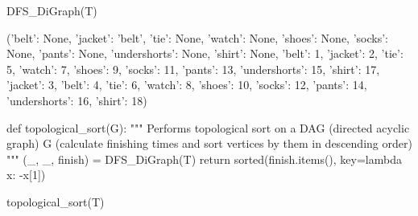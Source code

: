 \begin{sageCell}
    DFS_DiGraph(T)
\end{sageCell}
\begin{outCell}
    ({'belt': None,
      'jacket': 'belt',
      'tie': None,
      'watch': None,
      'shoes': None,
      'socks': None,
      'pants': None,
      'undershorts': None,
      'shirt': None},
     {'belt': 1,
      'jacket': 2,
      'tie': 5,
      'watch': 7,
      'shoes': 9,
      'socks': 11,
      'pants': 13,
      'undershorts': 15,
      'shirt': 17},
     {'jacket': 3,
      'belt': 4,
      'tie': 6,
      'watch': 8,
      'shoes': 10,
      'socks': 12,
      'pants': 14,
      'undershorts': 16,
      'shirt': 18})
\end{outCell}

\begin{sageCell}
def topological_sort(G):
    """
    Performs topological sort on a DAG (directed acyclic graph) G
    (calculate finishing times and sort vertices by them in
    descending order)
    """
    (_, _, finish) = DFS_DiGraph(T)
    return sorted(finish.items(), key=lambda x: -x[1])
\end{sageCell}

\begin{sageCell}
    topological_sort(T)
\end{sageCell}
\begin{outCell}
\end{outCell}
